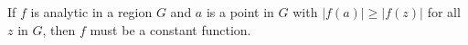 If $f$ is analytic in a region $G$ and $a$ is a point in $G$ with $|f(a)| \geq |f(z)|$ for all $z$ in $G$, then $f$ must be a constant function.
